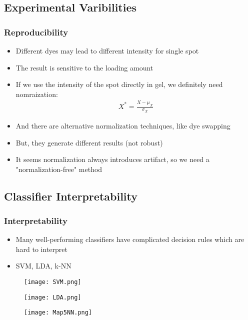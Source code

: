 \documentclass{beamer}
\begin{document}
\subsection{Experimental Varibilities}
\begin{frame}
\frametitle{Reproducibility}
\begin{itemize}
\item Different dyes may lead to different intensity for single spot
\item The result is sensitive to the loading amount 
\item If we use the intensity of the spot directly in gel, we definitely need nomraization:
  \begin{align*}
    X^* = \frac{X - \mu_X}{\sigma_X}
  \end{align*}
\item And there are alternative normalization techniques, like dye swapping
\item But, they generate different results (not robust)
\item It seems normalization always introduces artifact, so we need a "normalization-free" method 
\end{itemize}
\end{frame}

\subsection{Classifier Interpretability}
\begin{frame}
\frametitle{Interpretability}
\begin{itemize}
\item Many well-performing classifiers have complicated decision rules which are hard to interpret
\item SVM, LDA, k-NN
\end{itemize}
  \begin{figure}
    \begin{minipage}{.3\textwidth}
      \texttt{[image: SVM.png]}
      \cite{SVM}
    \end{minipage}
  	\begin{minipage}{.3\textwidth}
      \texttt{[image: LDA.png]}
      \cite{LDA}
    \end{minipage}
    \begin{minipage}{.3\textwidth}
      \texttt{[image: Map5NN.png]}
      \cite{kNN}
    \end{minipage}
  \end{figure}
\end{frame}
\end{document}
